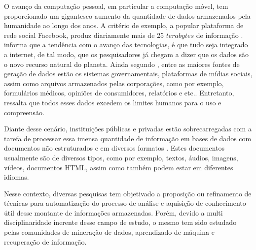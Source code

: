 
O avanço da computação pessoal, em particular a computação móvel, tem proporcionado um gigantesco
aumento da quantidade de dados armazenados pela humanidade ao longo dos anos. A critério de exemplo,
a popular plataforma de rede social Facebook\footnotemark, produz diariamente mais de 25 $terabytes$
de informação \cite{Havens2012}.  informa que a tendência com o avanço das
tecnologias, é que tudo seja integrado a internet, de tal modo, que os pesquisadores já chegam a
dizer que os dados são o novo recurso natural do planeta. Ainda segundo ,
entre as maiores fontes de geração de dados estão os sistemas governamentais, plataformas de mídias
sociais, assim como arquivos armazenados pelas corporações, como por exemplo, formulários médicos,
opiniões de consumidores, relatórios e etc.. Entretanto,  ressalta que 
todos esses dados excedem os limites humanos para o uso e compreensão.

Diante desse cenário, instituições públicas e privadas estão sobrecarregadas com a tarefa de
processar essa imensa quantidade de informação em bases de dados com documentos não estruturados e
em diversos formatos \cite{Kobayashi2008}. Estes documentos usualmente são de diversos tipos,
como por exemplo, textos, áudios, imagens, vídeos, documentos HTML, assim como também podem estar 
em diferentes idiomas. 

Nesse contexto, diversas pesquisas tem objetivado a proposição ou refinamento de técnicas para
automatização do processo de análise e aquisição de conhecimento útil desse montante de informações
armazenadas. Porém, devido a multi disciplinaridade inerente desse campo de estudo, o mesmo tem
sido estudado pelas comunidades de mineração de dados, aprendizado de máquina e recuperação de
informação.

